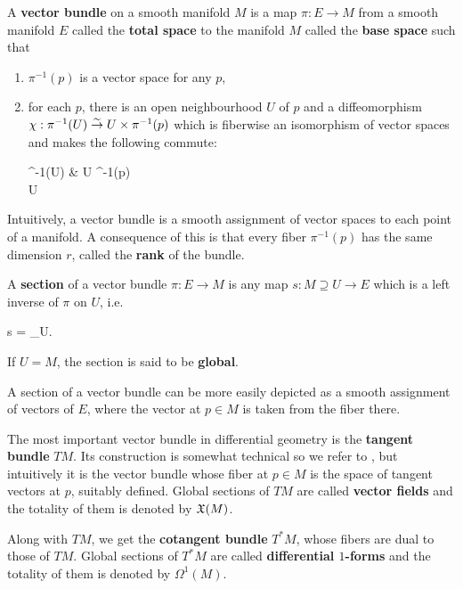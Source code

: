 \documentclass[main.tex]{subfiles}
\begin{document}
\begin{definition}
	A \textbf{vector bundle} on a smooth manifold $M$ is a map $\pi : E \to M$ from a smooth manifold $E$ called the \textbf{total space} to the manifold $M$ called the \textbf{base space} such that
	\begin{enumerate}
		\item $\pi^{-1}(p)$ is a vector space for any $p$,
		\item for each $p$, there is an open neighbourhood $U$ of $p$ and a diffeomorphism $\chi :\pi^{-1}(U) \overset{\sim}\to U \times \pi^{-1}(p)$ which is fiberwise an isomorphism of vector spaces and makes the following commute:
		\begin{diagram}
			\pi^{-1}(U)   \& U \times \pi^{-1}(p) \\
			U
		\end{diagram}
	\end{enumerate}
\end{definition}

Intuitively, a vector bundle is a smooth assignment of vector spaces to each point of a manifold. A consequence of this is that every fiber $\pi^{-1}(p)$ has the same dimension $r$, called the \textbf{rank} of the bundle.

\begin{definition}
	A \textbf{section} of a vector bundle $\pi : E \to M$ is any map $s : M \supseteq U \to E$ which is a left inverse of $\pi$ on $U$, i.e. \begin{eqalign}
		\pi \circ s = \id_U.
	\end{eqalign}
	If $U=M$, the section is said to be \textbf{global}.
\end{definition}

A section of a vector bundle can be more easily depicted as a smooth assignment of vectors of $E$, where the vector at $p \in M$ is taken from the fiber there.

The most important vector bundle in differential geometry is the \textbf{tangent bundle} $TM$. Its construction is somewhat technical so we refer to \cite{abate2011geometria}, but intuitively it is the vector bundle whose fiber at $p \in M$ is the space of tangent vectors at $p$, suitably defined. Global sections of $TM$ are called \textbf{vector fields} and the totality of them is denoted by $\mathfrak{X}(M)$.

Along with $TM$, we get the \textbf{cotangent bundle} $T^*M$, whose fibers are dual to those of $TM$. Global sections of $T^*M$ are called \textbf{differential $1$-forms} and the totality of them is denoted by $\Omega^1(M)$.
\end{document}
